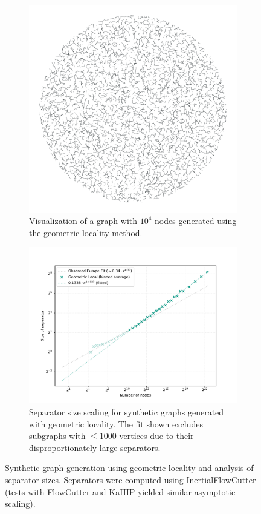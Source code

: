 \begin{figure}[tbhp]
    \begin{subfigure}[t]{0.38\linewidth}
		\centering
		\includegraphics[width=\linewidth]{graphics/local_embedding.png}
		\caption{Visualization of a graph with \(10^4\) nodes generated using the geometric locality method.}
		\label{fig:geometric_locality_graph_viz}
	\end{subfigure}
	\hfill
    \begin{subfigure}[t]{0.55\linewidth}
		\centering
		\includegraphics[width=\linewidth]{graphics/sep_local_embedding.pdf}
		\caption{Separator size scaling for synthetic graphs generated with geometric locality. The fit shown excludes subgraphs with \( \le 1000 \) vertices due to their disproportionately large separators. }
		\label{fig:geometric_locality_sep_plot}
	\end{subfigure}
	\caption{Synthetic graph generation using geometric locality and analysis of separator sizes. Separators were computed using InertialFlowCutter (tests with FlowCutter and KaHIP yielded similar asymptotic scaling).}
	\label{fig:geometric_locality_separators}
\end{figure}

